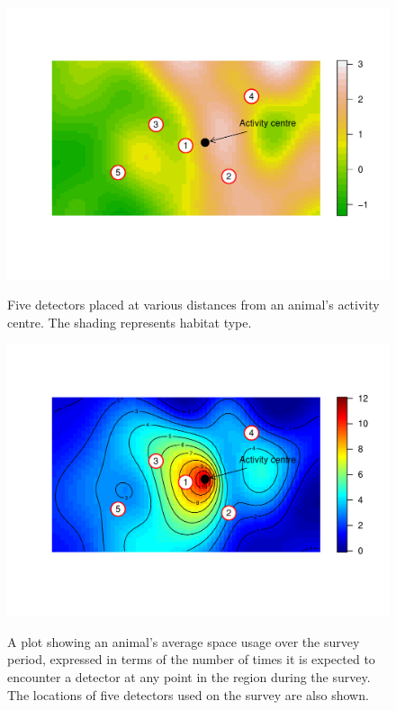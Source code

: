 \documentclass[graybox,envcountchap,sectrefs]{SpringerStyleFiles/styles/svmono}\usepackage[]{graphicx}\usepackage[]{color}
\begin{document}
\begin{figure}[ht]
\caption{\small Five detectors placed at various distances from an animal's activity centre. The shading represents habitat type.}
\centering
\vspace{-24pt}
\includegraphics[width=12cm]{keepfigure/habitat.pdf}
\label{fig:ER+detfun_habitat}
\end{figure}

\begin{figure}[ht]
\caption{\small A plot showing an animal's average space usage over the survey period, expressed in terms of the number of times it is expected to encounter a detector at any point in the region during the survey. The locations of five detectors used on the survey are also shown.}
\centering
\vspace{-24pt}
\includegraphics[width=12cm]{keepfigure/usage.pdf}
\label{fig:ER+detfun_habitat_encrate}
\end{figure}
\end{document}
